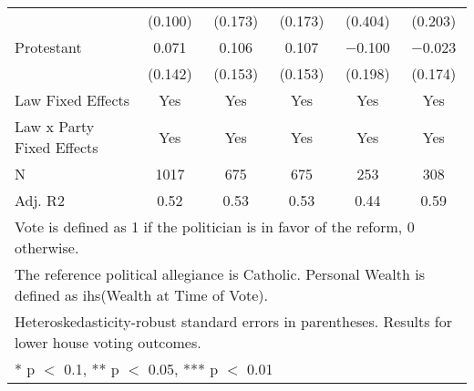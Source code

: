 \begin{table}
\begin{tabular}[t]{lccccc}
 & (\num{0.100}) & (\num{0.173}) & (\num{0.173}) & (\num{0.404}) & (\num{0.203})\\
Protestant & \num{0.071} & \num{0.106} & \num{0.107} & \num{-0.100} & \num{-0.023}\\
 & (\num{0.142}) & (\num{0.153}) & (\num{0.153}) & (\num{0.198}) & (\num{0.174})\\
\midrule
Law Fixed Effects & Yes & Yes & Yes & Yes & Yes\\
Law x Party Fixed Effects & Yes & Yes & Yes & Yes & Yes\\
N & \num{1017} & \num{675} & \num{675} & \num{253} & \num{308}\\
Adj. R2 & \num{0.52} & \num{0.53} & \num{0.53} & \num{0.44} & \num{0.59}\\
\bottomrule
\multicolumn{6}{l}{\rule{0pt}{1em}Vote is defined as 1 if the politician is in favor of the reform, 0 otherwise.}\\
\multicolumn{6}{l}{\rule{0pt}{1em}The reference political allegiance is Catholic. Personal Wealth is defined as ihs(Wealth at Time of Vote).}\\
\multicolumn{6}{l}{\rule{0pt}{1em}Heteroskedasticity-robust standard errors in parentheses. Results for lower house voting outcomes.}\\
\multicolumn{6}{l}{\rule{0pt}{1em}* p $<$ 0.1, ** p $<$ 0.05, *** p $<$ 0.01}\\
\end{tabular}
\end{table}
